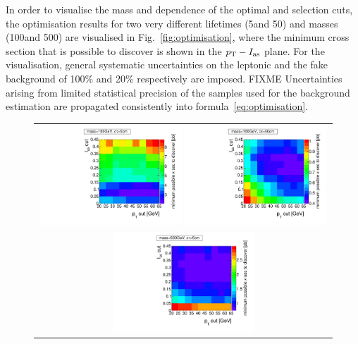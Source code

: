 In order to visualise the mass and \ctau dependence of the optimal \pt and \ias selection cuts, the optimisation results for two very different lifetimes (5\cm and 50\cm) and masses (100\gev and 500\gev) are visualised in Fig.~\ref{fig:optimisation}, where the minimum cross section that is possible to discover is shown in the $p_{\text{T}}-I_{\text{as}}$ plane.
For the visualisation, general systematic uncertainties on the leptonic and the fake background of 100\% and 20\% respectively are imposed.
FIXME Uncertainties arising from limited statistical precision of the samples used for the background estimation are propagated consistently into formula~\ref{eq:optimisation}.
\begin{figure}[!h]
  \centering 
  \vspace{30pt}
  \begin{tabular}{c}
    \includegraphics[width=0.49\textwidth]{figures/analysis/Optimisation/Madgraph_signal_mass_100_ctau_5cm_ECaloLe5_SOverDeltaBStatPlusSys.pdf} 
    \includegraphics[width=0.49\textwidth]{figures/analysis/Optimisation/Madgraph_signal_mass_100_ctau_50cm_ECaloLe5_SOverDeltaBStatPlusSys.pdf}\\ 
    \includegraphics[width=0.49\textwidth]{figures/analysis/Optimisation/Madgraph_signal_mass_500_ctau_5cm_ECaloLe5_SOverDeltaBStatPlusSys.pdf}

\end{tabular}
\end{figure}
